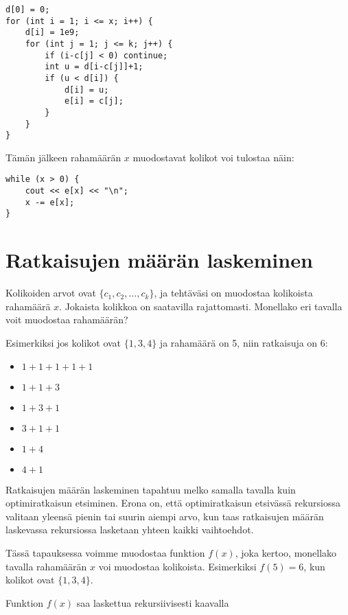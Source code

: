 \begin{lstlisting}
d[0] = 0;
for (int i = 1; i <= x; i++) {
    d[i] = 1e9;
    for (int j = 1; j <= k; j++) {
        if (i-c[j] < 0) continue;
        int u = d[i-c[j]]+1;
        if (u < d[i]) {
            d[i] = u;
            e[i] = c[j];
        }
    }
}
\end{lstlisting}

Tämän jälkeen rahamäärän $x$ muodostavat
kolikot voi tulostaa näin:

\begin{lstlisting}
while (x > 0) {
    cout << e[x] << "\n";
    x -= e[x];
}
\end{lstlisting}

\section{Ratkaisujen määrän laskeminen}

\begin{task}
Kolikoiden arvot ovat $\{c_1,c_2,\ldots,c_k\}$,
ja tehtäväsi on muodostaa kolikoista rahamäärä $x$.
Jokaista kolikkoa on saatavilla rajattomasti.
Monellako eri tavalla voit muodostaa rahamäärän?
\end{task}

\noindent
Esimerkiksi jos kolikot ovat $\{1,3,4\}$ ja rahamäärä on 5,
niin ratkaisuja on 6:

\begin{multicols}{2}
\begin{itemize}
\item $1+1+1+1+1$
\item $1+1+3$
\item $1+3+1$
\item $3+1+1$
\item $1+4$
\item $4+1$
\end{itemize}
\end{multicols}

Ratkaisujen määrän laskeminen tapahtuu melko samalla tavalla
kuin optimiratkaisun etsiminen.
Erona on, että optimiratkaisun etsivässä rekursiossa
valitaan yleensä pienin tai suurin aiempi arvo,
kun taas ratkaisujen määrän laskevassa rekursiossa lasketaan
yhteen kaikki vaihtoehdot.

Tässä tapauksessa voimme muodostaa funktion $f(x)$,
joka kertoo, monellako tavalla rahamäärän $x$
voi muodostaa kolikoista.
Esimerkiksi $f(5)=6$, kun kolikot ovat $\{1,3,4\}$.

Funktion $f(x)$ saa laskettua rekursiivisesti kaavalla

